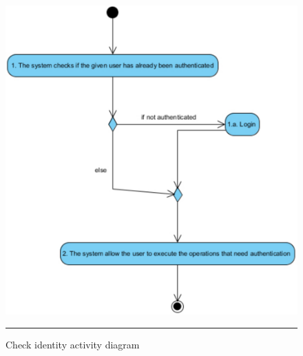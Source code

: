 \begin{figure}[htbp]
	\centering
		\includegraphics[scale=0.80]{./Figures/chapter4/figure4.pdf}
		\rule{35em}{0.5pt}
	\caption[Check identity activity diagram]{Check identity activity diagram}
	\label{fig:activityDiagramCheckIdentity}
\end{figure}

